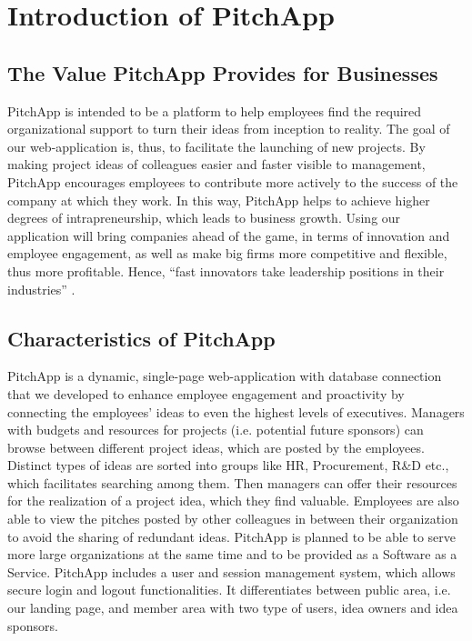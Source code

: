\chapter{Introduction of PitchApp}

\section{The Value PitchApp Provides for Businesses}

PitchApp is intended to be a platform to help employees find the required organizational support to turn their ideas from inception to reality. The goal of our web-application is, thus, to facilitate the launching of new projects. By making project ideas of colleagues easier and faster visible to management, PitchApp encourages employees to contribute more actively to the success of the company at which they work. In this way, PitchApp helps to achieve higher degrees of intrapreneurship, which leads to business growth. Using our application will bring companies ahead of the game, in terms of innovation and
employee engagement, as well as make big firms more competitive and flexible, thus more
profitable. Hence, “fast innovators take leadership positions in their industries” \parencite{SH90}.

\section{Characteristics of PitchApp}

PitchApp is a dynamic, single-page web-application with database connection that we developed to enhance employee engagement and proactivity by connecting the employees’ ideas to even the highest levels of executives. Managers with budgets and resources for projects (i.e. potential future sponsors) can browse between different project ideas, which are posted by the employees. Distinct types of ideas are sorted into groups like HR, Procurement, R\&D etc., which facilitates searching among them. Then managers can offer their resources for the realization of a project idea, which they find valuable. Employees are also able to view the pitches posted by other colleagues in between their organization to avoid the sharing of redundant ideas. PitchApp is planned to be able to serve more large organizations at the same time and to be provided as a Software as a Service. PitchApp includes a user and session management system, which allows secure login and logout functionalities. It differentiates between public area, i.e. our landing page, and member area with two type of users, idea owners and idea sponsors.

